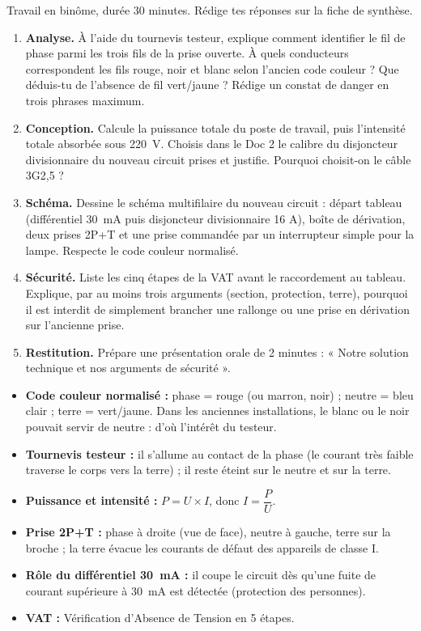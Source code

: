 \documentclass[11pt]{article}
\newcounter{popsec}
\newcounter{popsub}
\newcommand{\courssub}[1]{%
  \stepcounter{popsub}%
  \par\vspace{9pt}\noindent{\popxbold\fontsize{11.5}{13}\selectfont\color{popink}{\color{poporange}\thepopsec.\thepopsub}\hspace{6pt}#1}\par\nopagebreak\vspace{4pt}
}
\begin{document}
\courssub{Consignes}

Travail en binôme, durée 30 minutes. Rédige tes réponses sur la fiche de synthèse.

\begin{enumerate}
\item \textbf{Analyse.} À l'aide du tournevis testeur, explique comment identifier le fil de phase parmi les trois fils de la prise ouverte. À quels conducteurs correspondent les fils rouge, noir et blanc selon l'ancien code couleur ? Que déduis-tu de l'absence de fil vert/jaune ? Rédige un constat de danger en trois phrases maximum.
\item \textbf{Conception.} Calcule la puissance totale du poste de travail, puis l'intensité totale absorbée sous \SI{220}{V}. Choisis dans le Doc 2 le calibre du disjoncteur divisionnaire du nouveau circuit prises et justifie. Pourquoi choisit-on le câble 3G2,5 ?
\item \textbf{Schéma.} Dessine le schéma multifilaire du nouveau circuit : départ tableau (différentiel \SI{30}{mA} puis disjoncteur divisionnaire 16 A), boîte de dérivation, deux prises 2P+T et une prise commandée par un interrupteur simple pour la lampe. Respecte le code couleur normalisé.
\item \textbf{Sécurité.} Liste les cinq étapes de la VAT avant le raccordement au tableau. Explique, par au moins trois arguments (section, protection, terre), pourquoi il est interdit de simplement brancher une rallonge ou une prise en dérivation sur l'ancienne prise.
\item \textbf{Restitution.} Prépare une présentation orale de 2 minutes : « Notre solution technique et nos arguments de sécurité ».
\end{enumerate}

\courssub{Ressources à mobiliser}

\begin{aretenir}
\begin{itemize}
\item \textbf{Code couleur normalisé :} phase = rouge (ou marron, noir) ; neutre = bleu clair ; terre = vert/jaune. Dans les anciennes installations, le blanc ou le noir pouvait servir de neutre : d'où l'intérêt du testeur.
\item \textbf{Tournevis testeur :} il s'allume au contact de la phase (le courant très faible traverse le corps vers la terre) ; il reste éteint sur le neutre et sur la terre.
\item \textbf{Puissance et intensité :} $P = U \times I$, donc $I = \dfrac{P}{U}$.
\item \textbf{Prise 2P+T :} phase à droite (vue de face), neutre à gauche, terre sur la broche ; la terre évacue les courants de défaut des appareils de classe I.
\item \textbf{Rôle du différentiel \SI{30}{mA} :} il coupe le circuit dès qu'une fuite de courant supérieure à \SI{30}{mA} est détectée (protection des personnes).
\item \textbf{VAT :} Vérification d'Absence de Tension en 5 étapes.
\end{itemize}
\end{aretenir}
\end{document}
